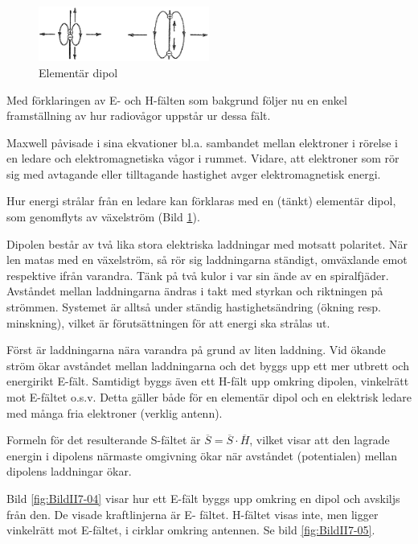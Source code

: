 \begin{figure}
\includegraphics[width=0.5\textwidth]{images/cropped_pdfs/bild_2_7-03.pdf}
\caption{Elementär dipol}
\label{fig:BildII7-03}
\end{figure}

Med förklaringen av E- och H-fälten som bakgrund följer nu en enkel
framställning av hur radiovågor uppstår ur dessa fält.

Maxwell påvisade i sina ekvationer bl.a. sambandet mellan elektroner
i rörelse i en ledare och elektromagnetiska vågor i rummet. Vidare,
att elektroner som rör sig med avtagande eller tilltagande hastighet
avger elektromagnetisk energi.

Hur energi strålar från en ledare kan förklaras med en (tänkt)
elementär dipol, som genomflyts av växelström (Bild \ref{fig:BildII7-03}).

Dipolen består av två lika stora elektriska laddningar med motsatt
polaritet. När len matas med en växelström, så rör sig laddningarna
ständigt, omväxlande emot respektive ifrån varandra. Tänk på två kulor
i var sin ände av en spiralfjäder. Avståndet mellan laddningarna
ändras i takt med styrkan och riktningen på strömmen. Systemet är
alltså under ständig hastighetsändring (ökning resp. minskning),
vilket är förutsättningen för att energi ska strålas ut.

Först är laddningarna nära varandra på grund av liten laddning. Vid
ökande ström ökar avståndet mellan laddningarna och det byggs upp ett
mer utbrett och energirikt E-fält. Samtidigt byggs även ett H-fält upp
omkring dipolen, vinkelrätt mot E-fältet o.s.v. Detta gäller både för
en elementär dipol och en elektrisk ledare med många fria elektroner
(verklig antenn).

Formeln för det resulterande S-fältet är \(\overline{S} =
\overline{S}\cdot\overline{H}\), vilket visar att den lagrade energin
i dipolens närmaste omgivning ökar när avståndet (potentialen) mellan
dipolens laddningar ökar.

Bild \ref{fig:BildII7-04} visar hur ett E-fält byggs upp omkring en dipol och
avskiljs från den. De visade kraftlinjerna är E- fältet. H-fältet
visas inte, men ligger vinkelrätt mot E-fältet, i cirklar omkring
antennen. Se bild \ref{fig:BildII7-05}.

